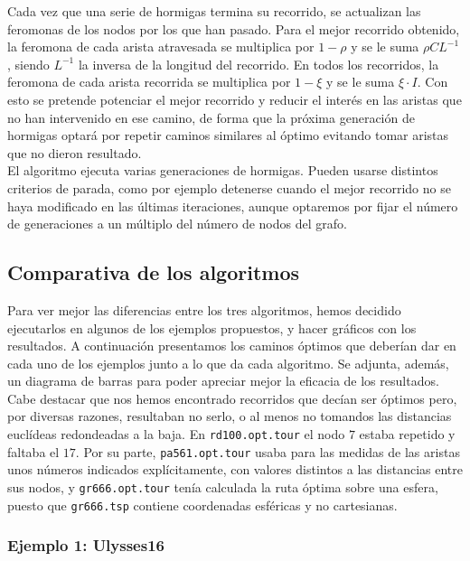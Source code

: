 Cada vez que una serie de hormigas termina su recorrido, se actualizan las feromonas de los nodos por los que han pasado. Para el mejor recorrido obtenido, la feromona de cada arista atravesada se multiplica por $1-\rho$ y se le suma $\rho C L^{-1}$, siendo $L^{-1}$ la inversa de la longitud del recorrido. En todos los recorridos, la feromona de cada arista recorrida se multiplica por $1-\xi$ y se le suma $\xi \cdot I$. Con esto se pretende potenciar el mejor recorrido y reducir el interés en las aristas que no han intervenido en ese camino, de forma que la próxima generación de hormigas optará por repetir caminos similares al óptimo evitando tomar aristas que no dieron resultado. \\

El algoritmo ejecuta varias generaciones de hormigas. Pueden usarse distintos criterios de parada, como por ejemplo detenerse cuando el mejor recorrido no se haya modificado en las últimas iteraciones, aunque optaremos por fijar el número de generaciones a un múltiplo del número de nodos del grafo.

\subsection{Comparativa de los algoritmos}

Para ver mejor las diferencias entre los tres algoritmos, hemos decidido ejecutarlos en algunos de los ejemplos propuestos, y hacer gráficos con los resultados. A continuación presentamos los caminos óptimos que deberían dar en cada uno de los ejemplos junto a lo que da cada algoritmo. Se adjunta, además, un diagrama de barras para poder apreciar mejor la eficacia de los resultados. \\

Cabe destacar que nos hemos encontrado recorridos que decían ser óptimos pero, por diversas razones, resultaban no serlo, o al menos no tomandos las distancias euclídeas redondeadas a la baja. En \texttt{rd100.opt.tour} el nodo $7$ estaba repetido y faltaba el $17$. Por su parte, \texttt{pa561.opt.tour} usaba para las medidas de las aristas unos números indicados explícitamente, con valores distintos a las distancias entre sus nodos, y \texttt{gr666.opt.tour} tenía calculada la ruta óptima sobre una esfera, puesto que \texttt{gr666.tsp} contiene coordenadas esféricas y no cartesianas.

\subsubsection{Ejemplo 1: Ulysses16}


